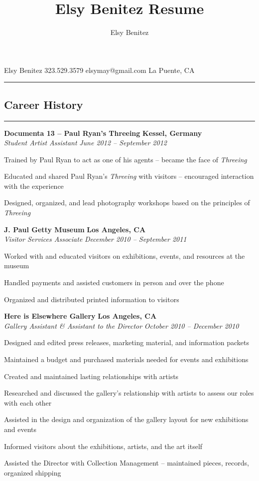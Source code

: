 \documentclass[10pt,letterpaper]{article}			%
\author{Elsy Benitez}								%
\title{Elsy Benitez Resume}							%
\newcommand{\JobHeader}[4]{							%
			\textbf{#1}
			\hfill
			\textbf{#2}
			\\
			\emph{#3}
			\hfill
			\emph{#4}\par 
			\vspace{-.8em}
			}
\begin{document}
{\Huge Elsy Benitez}
\hfill 323.529.3579
\hfill elsymay@gmail.com
\hfill La Puente, CA
\vspace{-.35em}
\hrule
\vspace{-1.4em}
\subsection*{Career History}
\vspace{-.7em}
\hrule
\vspace{.4em}
	\JobHeader{Documenta 13 -- Paul Ryan's Threeing}{Kessel, Germany}{Student Artist Assistant}{June 2012 -- September 2012}
			\begin{itemize*}
			\item Trained by Paul Ryan to act as one of his agents -- became the face of \emph{Threeing}
			\item Educated and shared Paul Ryan's \emph{Threeing} with visitors -- encouraged interaction with the experience
			\item Designed, organized, and lead photography workshops based on the principles of \emph{Threeing}
			\end{itemize*}
			\vspace{-.6em}
	\JobHeader{J. Paul Getty Museum}{Los Angeles, CA}{Visitor Services Associate}{December 2010 -- September 2011}
			\begin{itemize*}
			\item Worked with and educated visitors on exhibitions, events, and resources at the museum
			\item Handled payments and assisted customers in person and over the phone
			\item Organized and distributed printed information to visitors
			\end{itemize*}
			\vspace{-.6em}
	\JobHeader{Here is Elsewhere Gallery}{Los Angeles, CA}{Gallery Assistant \& Assistant to the Director}{October 2010 -- December 2010}
			\begin{itemize*}
			\item Designed and edited press releases, marketing material, and information packets
			\item Maintained a budget and purchased materials needed for events and exhibitions
			\item Created and maintained lasting relationships with artists
			\item Researched and discussed the gallery's relationship with artists to assess our roles with each other
			\item Assisted in the design and organization of the gallery layout for new exhibitions and events 
			\item Informed visitors about the exhibitions, artists, and the art itself
			\item Assisted the Director with Collection Management -- maintained pieces, records, organized shipping
			\end{itemize*}
\end{document}
